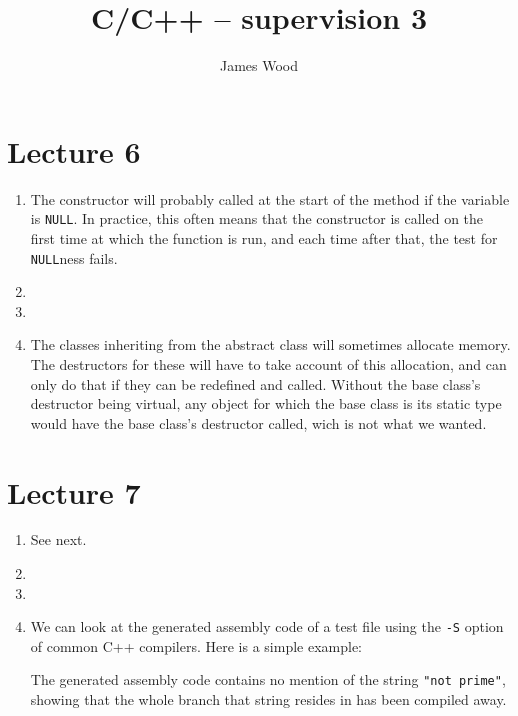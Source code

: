 \documentclass{article}
\begin{document}
\title{C/C++ -- supervision 3}
\author{James Wood}
\maketitle

\section*{Lecture 6}
\begin{enumerate}
  \item The constructor will probably called at the start of the method if the variable is \texttt{NULL}. In practice, this often means that the constructor is called on the first time at which the function is run, and each time after that, the test for \texttt{NULL}ness fails.
  \item \hfill
    
  \item \hfill
    
  \item The classes inheriting from the abstract class will sometimes allocate memory. The destructors for these will have to take account of this allocation, and can only do that if they can be redefined and called. Without the base class's destructor being virtual, any object for which the base class is its static type would have the base class's destructor called, wich is not what we wanted.
\end{enumerate}

\section*{Lecture 7}
\begin{enumerate}
  \item See next.
  \item \hfill
    
  \item \hfill
    
  \item We can look at the generated assembly code of a test file using the \texttt{-S} option of common C++ compilers. Here is a simple example:
    
    The generated assembly code contains no mention of the string \texttt{"not prime"}, showing that the whole branch that string resides in has been compiled away.
\end{enumerate}
\end{document}
